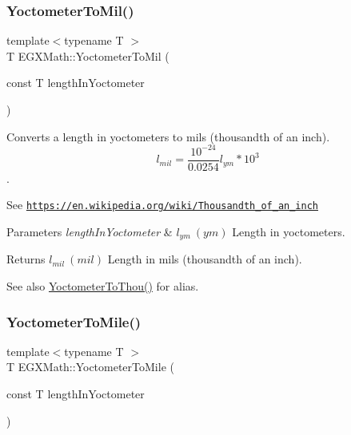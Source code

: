 \subsubsection{\texorpdfstring{Yoctometer\+To\+Mil()}{YoctometerToMil()}}
{\footnotesize\ttfamily template$<$typename T $>$ \\
T E\+G\+X\+Math\+::\+Yoctometer\+To\+Mil (\begin{DoxyParamCaption}\item[{const T}]{length\+In\+Yoctometer }\end{DoxyParamCaption})}



Converts a length in yoctometers to mils (thousandth of an inch). \[ l_{mil}= \frac{10^{-24}}{0.0254} l_{ym} * 10^{3} \]. 

See \href{https://en.wikipedia.org/wiki/Thousandth_of_an_inch}{\tt https\+://en.\+wikipedia.\+org/wiki/\+Thousandth\+\_\+of\+\_\+an\+\_\+inch} 
\begin{DoxyParams}{Parameters}
{\em length\+In\+Yoctometer} & $ l_{ym}\ (ym)$ Length in yoctometers. \\
\hline
\end{DoxyParams}
\begin{DoxyReturn}{Returns}
$ l_{mil}\ (mil)$ Length in mils (thousandth of an inch). 
\end{DoxyReturn}
\begin{DoxySeeAlso}{See also}
\mbox{\hyperlink{group___e_g_x_math-_conversions-_length_conversions-_yoctometer-_imperial_ga9c2fbce1711afe0740edd868815ffea1}{Yoctometer\+To\+Thou()}} for alias. 
\end{DoxySeeAlso}
\mbox{\label{group___e_g_x_math-_conversions-_length_conversions-_yoctometer-_imperial_gae40e8cf52937348b127013a3dbe89105}} 
\subsubsection{\texorpdfstring{Yoctometer\+To\+Mile()}{YoctometerToMile()}}
{\footnotesize\ttfamily template$<$typename T $>$ \\
T E\+G\+X\+Math\+::\+Yoctometer\+To\+Mile (\begin{DoxyParamCaption}\item[{const T}]{length\+In\+Yoctometer }\end{DoxyParamCaption})}



